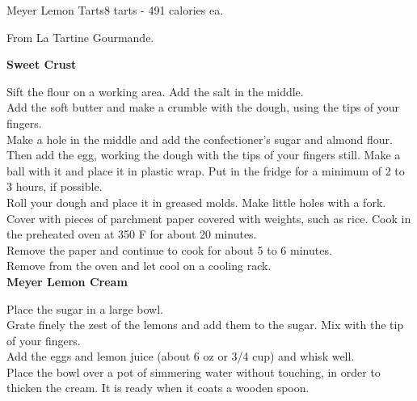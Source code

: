 \begin{recipe}{Meyer Lemon Tarts}{8 tarts - 491 calories ea.}{}

\freeform From La Tartine Gourmande.


\textbf{Sweet Crust}

Sift the flour on a working area. Add the salt in the middle.\\

Add the soft butter and make a crumble with the dough, using the tips of your fingers.\\

Make a hole in the middle and add the confectioner’s sugar and almond flour. Then add the egg, working the dough with the tips of your fingers still. Make a ball with it and place it in plastic wrap. Put in the fridge for a minimum of 2 to 3 hours, if possible.\\

Roll your dough and place it in greased molds. Make little holes with a fork. Cover with pieces of parchment paper covered with weights, such as rice. Cook in the preheated oven at 350 F for about 20 minutes.\\

Remove the paper and continue to cook for about 5 to 6 minutes.\\

Remove from the oven and let cool on a cooling rack.\\

\textbf{Meyer Lemon Cream}

Place the sugar in a large bowl.\\

Grate finely the zest of the lemons and add them to the sugar. Mix with the tip of your fingers.\\

Add the eggs and lemon juice (about 6 oz or 3/4 cup) and whisk well.\\

Place the bowl over a pot of simmering water without touching, in order to thicken the cream. It is ready when it coats a wooden spoon.\newpage


\end{recipe}
